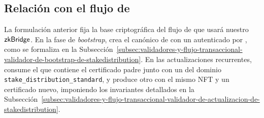 \subsection{Relación con el flujo de \texorpdfstring{\StakeDistribution}{StakeDistribution}}
\label{subsec:cadena-de-certificados-relacion-con-el-flujo-de-stakedistribution}

La formulación anterior fija la base criptográfica del flujo de \StakeDistribution que usará nuestro $\textsf{zkBridge}$. En la fase de \textit{bootstrap}, \StakeDistributionGenesisTxTemplate crea el \UTxO canónico de \StakeDistribution con un \GenesisCertificate autenticado por \GenesisVerificationKey, como se formaliza en la Subsección~\ref{subsec:validadores-y-flujo-transaccional-validador-de-bootstrap-de-stakedistribution}. En las actualizaciones recurrentes, \StakeDistributionStandardTxTemplate consume el \UTxO que contiene el certificado padre junto con un \ProofReceipt del dominio \texttt{stake\_distribution\_standard}, y produce otro \UTxO con el mismo NFT y un certificado nuevo, imponiendo los invariantes detallados en la Subsección~\ref{subsec:validadores-y-flujo-transaccional-validador-de-actualizacion-de-stakedistribution}.
